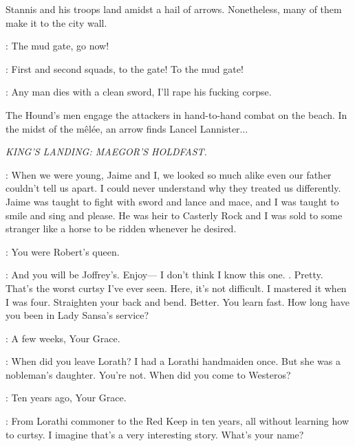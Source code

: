 \n Stannis and his troops land amidst a hail of arrows. Nonetheless, many of them make it to the city wall.

\STANNIS: The mud gate, go now! 

\CAPTAIN: First and second squads, to the gate! To the mud gate! 


\HOUND: Any man dies with a clean sword, I'll rape his fucking corpse. 


\n The Hound's men engage the attackers in hand-to-hand combat on the beach. In the midst of the m\^el\'ee, an arrow finds Lancel Lannister$\ldots$



\scene

\textit{KING'S LANDING: MAEGOR'S HOLDFAST.}


\CERSEI: When we were young, Jaime and I, we looked so much alike even our father couldn't tell us apart. I could never understand why they treated us differently. Jaime was taught to fight with sword and lance and mace, and I was taught to smile and sing and please. He was heir to Casterly Rock and I was sold to some stranger like a horse to be ridden whenever he desired. 

\SANSA: You were Robert's queen. 

\CERSEI: And you will be Joffrey's. Enjoy---  I don't think I know this one. . Pretty.  That's the worst curtsy I've ever seen. Here, it's not difficult. I mastered it when I was four. Straighten your back and bend.  Better. You learn fast. How long have you been in Lady Sansa's service?

\SHAE: A few weeks, Your Grace. 

\CERSEI: When did you leave Lorath?  I had a Lorathi handmaiden once. But she was a nobleman's daughter. You're not. When did you come to Westeros? 

\SHAE: Ten years ago, Your Grace. 

\CERSEI: From Lorathi commoner to the Red Keep in ten years, all without learning how to curtsy. I imagine that's a very interesting story. What's your name? 

